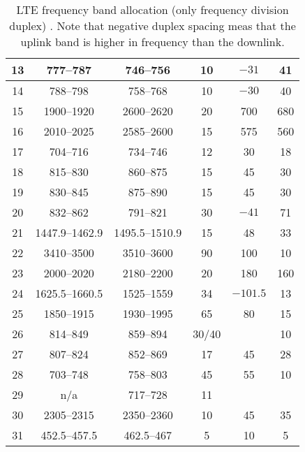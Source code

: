 \begin{table}[htbp]
\begin{tabular}{|c|c|c|c|c|c|}
    13 & 777--787   & 746--756   & 10 & $-31$  & 41  \\ \hline
    14 & 788--798   & 758--768   & 10 & $-30$  & 40  \\ \hline
    15 & 1900--1920 & 2600--2620 & 20 & 700  & 680  \\ \hline
    16 & 2010--2025 & 2585--2600 & 15 & 575 & 560 \\ \hline
    17 & 704--716   & 734--746   & 12 & 30  & 18  \\ \hline
    18 & 815--830   & 860--875   & 15 & 45  & 30  \\ \hline
    19 & 830--845   & 875--890   & 15 & 45  & 30  \\ \hline
    20 & 832--862   & 791--821   & 30 & $-41$  & 71  \\ \hline
    21 & 1447.9--1462.9 & 1495.5--1510.9 & 15 & 48  & 33  \\ \hline
    22 & 3410--3500 & 3510--3600 & 90 & 100  & 10  \\ \hline
    23 & 2000--2020 & 2180--2200 & 20 & 180  & 160  \\ \hline
    24 & 1625.5--1660.5 & 1525--1559 & 34 & $-101.5$  & 13  \\ \hline
    25 & 1850--1915 & 1930--1995 & 65 & 80  & 15  \\ \hline
    26 & 814--849   & 859--894   & 30/40 &     & 10  \\ \hline
    27 & 807--824   & 852--869   & 17 & 45  & 28  \\ \hline
    28 & 703--748   & 758--803   & 45 & 55  & 10  \\ \hline
    29 & n/a         & 717--728   & 11 &     &     \\ \hline
    30 & 2305--2315 & 2350--2360 & 10 & 45  & 35  \\ \hline
    31 & 452.5--457.5 & 462.5--467 & 5  & 10  & 5   \\ \hline
  \end{tabular}
  \caption{LTE frequency band allocation (only frequency division duplex) \cite{radio2015electronics}. Note that negative duplex spacing meas that the uplink band is higher in frequency than the downlink.}
  \label{tab:ltefreqband}
\end{table}

